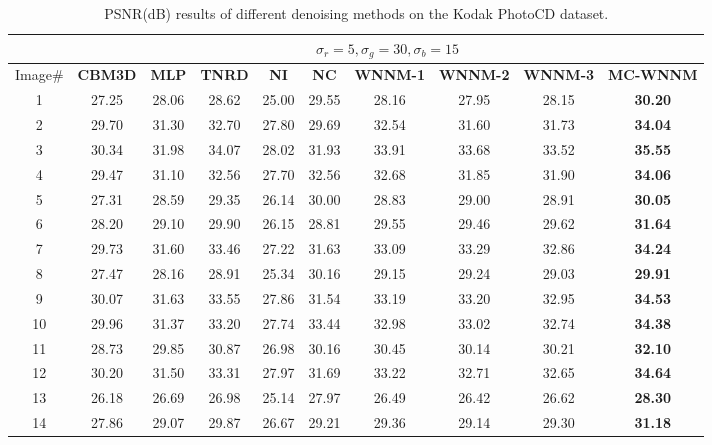 \documentclass[10pt,onecolumn,letterpaper]{article}
\begin{document}
\vspace{5mm}
\begin{table}[!htbp]
\caption{PSNR(dB) results of different denoising methods on the Kodak PhotoCD dataset.}
\label{t3}
\begin{center}
\renewcommand\arraystretch{1.0}
\footnotesize
\begin{tabular}{|c||c|c|c|c|c|c|c|c|c|}
\hline
&\multicolumn{9}{c|}{ $\sigma_{r} = 5, \sigma_{g} = 30, \sigma_{b} = 15$}
\\
\hline
\hline
Image\#
&
\textbf{CBM3D}
&
\textbf{MLP}
&
\textbf{TNRD}
&
\textbf{NI}
&
\textbf{NC}
&
\textbf{WNNM-1}
&
\textbf{WNNM-2}
&
\textbf{WNNM-3}
&
\textbf{MC-WNNM}
\\
\hline
1 & 27.25 & 28.06 & 28.62 & 25.00 & 29.55 & 28.16 & 27.95 & 28.15 & \textbf{30.20}
\\
\hline
2 & 29.70 & 31.30 & 32.70 & 27.80 & 29.69 & 32.54 & 31.60 & 31.73 & \textbf{34.04}
\\
\hline
3 & 30.34 & 31.98 & 34.07 & 28.02 & 31.93 & 33.91 & 33.68 & 33.52 & \textbf{35.55}
\\
\hline 
4 & 29.47 & 31.10 & 32.56 & 27.70 & 32.56 & 32.68 & 31.85 & 31.90 & \textbf{34.06} 
\\
\hline
5 & 27.31 & 28.59 & 29.35 & 26.14 & 30.00 & 28.83 & 29.00 & 28.91 & \textbf{30.05}
\\
\hline
6 & 28.20 & 29.10 & 29.90 & 26.15 & 28.81 & 29.55 & 29.46 & 29.62 & \textbf{31.64}
\\
\hline
7 & 29.73 & 31.60 & 33.46 & 27.22 & 31.63 & 33.09 & 33.29 & 32.86 & \textbf{34.24} 
\\
\hline
8 & 27.47 & 28.16 & 28.91 & 25.34 & 30.16 & 29.15 & 29.24 & 29.03 & \textbf{29.91}
\\
\hline
9 & 30.07 & 31.63 & 33.55 & 27.86 & 31.54 & 33.19 & 33.20 & 32.95 & \textbf{34.53}
\\
\hline
10 & 29.96 & 31.37 & 33.20 & 27.74 & 33.44 & 32.98 & 33.02 & 32.74 & \textbf{34.38}
\\
\hline
11 & 28.73 & 29.85 & 30.87 & 26.98 & 30.16 & 30.45 & 30.14 & 30.21 & \textbf{32.10}
\\
\hline
12 & 30.20 & 31.50 & 33.31 & 27.97 & 31.69 & 33.22 & 32.71 & 32.65 & \textbf{34.64}
\\
\hline
13 & 26.18 & 26.69 & 26.98 & 25.14 & 27.97 & 26.49 & 26.42 & 26.62 & \textbf{28.30}
\\
\hline
14 & 27.86 & 29.07 & 29.87 & 26.67 & 29.21 & 29.36 & 29.14 & 29.30 & \textbf{31.18}
\\

\end{tabular}
\end{center}
\end{table}
\end{document}

